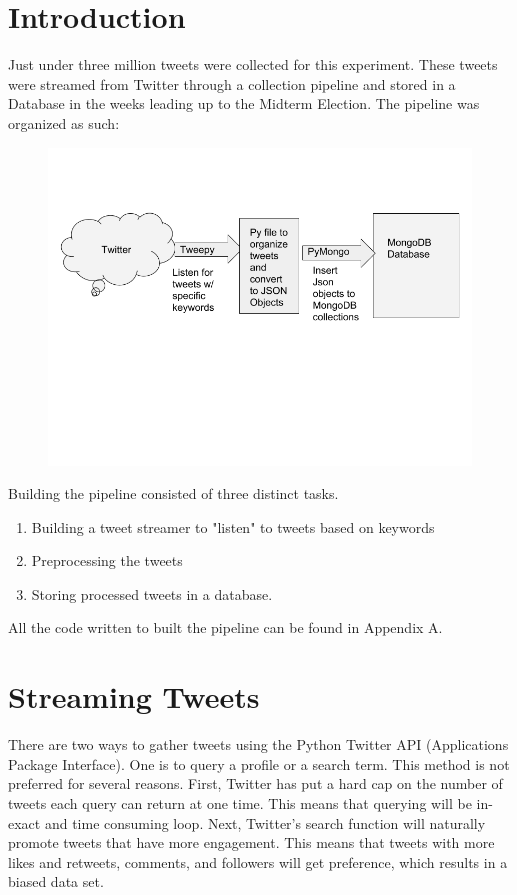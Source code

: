 \documentclass[11pt, twoside, reqno]{article}
\begin{document}
\label{label}
\section{Introduction}
\hspace{0.1in} Just under three million tweets were collected for this experiment. These tweets were streamed from Twitter through a collection pipeline and stored in a Database in the weeks leading up to the Midterm Election. The pipeline was organized as such:

\begin{figure}[h]
	\includegraphics[scale=0.5]{data_collection}
\end{figure}

Building the pipeline consisted of three distinct tasks. 
\begin{enumerate}
	\item Building a tweet streamer to "listen" to tweets based on keywords
	\item Preprocessing the tweets
	\item Storing processed tweets in a database. 
\end{enumerate}
All the code written to built the pipeline can be found in Appendix A.


\section{Streaming Tweets}
\hspace{0.1in} There are two ways to gather tweets using the Python Twitter API (Applications Package Interface). One is to query a profile or a search term. This method is not preferred for several reasons. First, Twitter has put a hard cap on the number of tweets each query can return at one time. This means that querying will be in-exact and time consuming loop. Next, Twitter's search function will naturally promote tweets that have more engagement. This means that tweets with more likes and retweets, comments, and followers will get preference, which results in a biased data set. 
\end{document}
